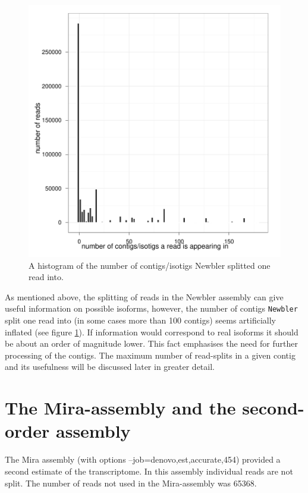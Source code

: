 \documentclass[12pt,a4paper]{article}
\begin{document}
\newpage
  

\begin{figure}[H]
  \centering
  
\includegraphics{Method-008}

\caption{A histogram of the number of contigs/isotigs Newbler splitted
  one read into.}
  \label{fig:newdist}
\end{figure}

As mentioned above, the splitting of reads in the Newbler assembly can
give useful information on possible isoforms, however, the number of
contigs \texttt{Newbler} split one read into (in some cases more than
100 contigs) seems artificially inflated (see figure
\ref{fig:newdist}). If information would correspond to real isoforms
it should be about an order of magnitude lower. This fact emphasises
the need for further processing of the contigs. The maximum number of
read-splits in a given contig and its usefulness will be discussed
later in greater detail.

\section{The Mira-assembly and the second-order assembly}
\label{sec:assembly-sec}

The Mira assembly (with options --job=denovo,est,accurate,454)
provided a second estimate of the transcriptome. In this assembly
individual reads are not split. The number of reads not used in the
Mira-assembly was 65368.
\end{document}
